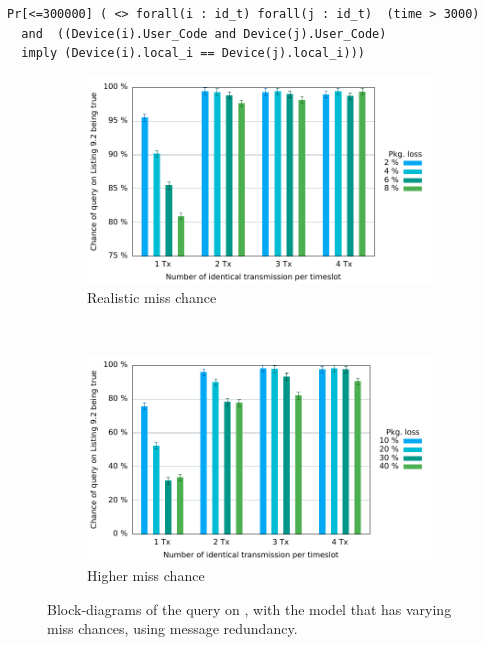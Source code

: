\begin{lstlisting}[style=UPPAAL, caption={Query for UPPAAL asking if for all devices i and j, when they are in the location \texttt{User\_Code} will they have they then have the same value for \texttt{local\_i}.}, label={stable-network-query}, float=p]
Pr[<=300000] ( <> forall(i : id_t) forall(j : id_t)  (time > 3000) 
  and  ((Device(i).User_Code and Device(j).User_Code) 
  imply (Device(i).local_i == Device(j).local_i)))
\end{lstlisting} 
 
\begin{figure}[p]
\begin{subfigure}{\linewidth}
\centering
\includegraphics{Figures/Graphs/gnuplot/ccucChance/graph2.pdf} 
\caption{Realistic miss chance}
\label{CCUC-Graph-UPPAAL}
\end{subfigure}\\
\begin{subfigure}{\linewidth}
\centering
\includegraphics{Figures/Graphs/gnuplot/ccucChance/graph3.pdf} 
\caption{Higher miss chance}
\label{fig:crazy_graph}
\end{subfigure}
\caption{Block-diagrams of the query on , with the model that has varying miss chances, using message redundancy.}
\end{figure} 

